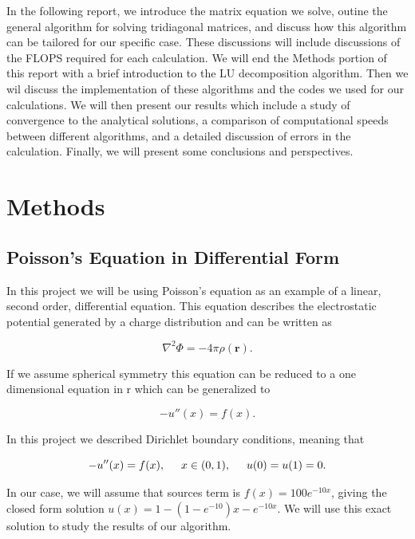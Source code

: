 \documentclass[%
oneside,                 %
final,                   %
10pt]{article}
\begin{document}
In the following report, we introduce the matrix equation we solve, outine the general algorithm for solving tridiagonal matrices, and discuss how this algorithm can be tailored for our specific case.  These discussions will include discussions of the FLOPS required for each calculation.  We will end the Methods portion of this report with a brief introduction to the LU decomposition algorithm.  Then we wil discuss the implementation of these algorithms and the codes we used for our calculations.  We will then present our results which include a study of convergence to the analytical solutions, a comparison of computational speeds between different algorithms, and a detailed discussion of errors in the calculation.   Finally, we will present some conclusions and perspectives. 

\section{Methods}

\subsection{Poisson's Equation in Differential Form}

In this project we will be using Poisson's equation as an example of a linear, second order, differential equation.  This equation describes the electrostatic potential generated by a charge distribution and can be written as 

\begin{equation*}
\nabla^2 \Phi = -4\pi \rho (\mathbf{r}).
\end{equation*}

If we assume spherical symmetry this equation can be reduced to a one dimensional equation in r which can be generalized to 

\begin{equation*}
-u''(x) = f(x).
\end{equation*}

In this project we described Dirichlet boundary conditions, meaning that 

\begin{equation*}
-u''(x) = f(x), \hspace{0.5cm} x\in(0,1), \hspace{0.5cm} u(0) = u(1) = 0.
\end{equation*}

In our case, we will assume that sources term is $f(x) = 100e^{-10x}$, giving the closed form solution  $u(x) = 1-(1-e^{-10})x-e^{-10x}$.  We will use this exact solution to study the results of our algorithm.
\end{document}
